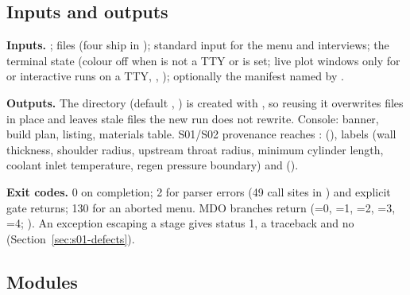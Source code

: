 \subsection{Inputs and outputs}\label{sec:s01-io}

\textbf{Inputs.} ;  files (four ship in ); standard input for the menu and interviews; the terminal state (colour off when  is not a TTY or  is set; live plot windows only for  or interactive runs on a TTY, , ); optionally the manifest named by .

\textbf{Outputs.} The  directory (default , ) is created with , so reusing it overwrites files in place and leaves stale files the new run does not rewrite. Console: banner, build plan,  listing, materials table. S01/S02 provenance reaches :  (),  labels (wall thickness, shoulder radius, upstream throat radius, minimum cylinder length, coolant inlet temperature, regen pressure boundary) and  \code{=}  ().

\textbf{Exit codes.} 0 on completion; 2 for parser errors (49  call sites in ) and explicit gate returns; 130 for an aborted menu. MDO branches return  (=0, =1, =2, =3, =4; ). An exception escaping a stage gives status 1, a traceback and no  (Section~\ref{sec:s01-defects}).

\subsection{Modules}\label{sec:s01-modules}


